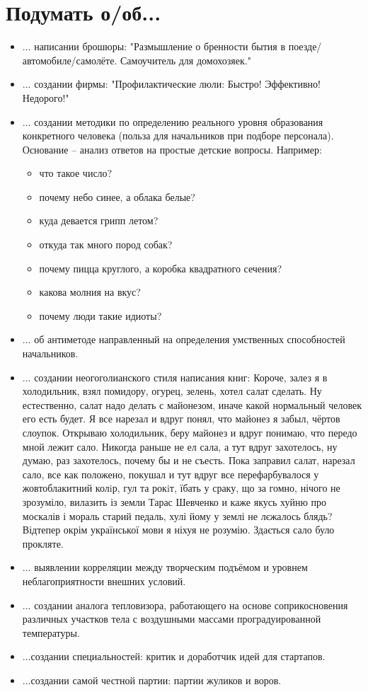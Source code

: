 \section{Подумать о/об...}
\begin{itemize}
\item ... написании брошюры: "Размышление о бренности бытия в поезде/автомобиле/самолёте. Самоучитель для домохозяек."
\item ... создании фирмы: "Профилактические люли: Быстро! Эффективно! Недорого!"
\item ...  создании методики по определению реального уровня образования конкретного человека (польза для начальников при подборе персонала). Основание -- анализ ответов на простые детские вопросы.
Например:
    \begin{itemize}
        \item что такое число?
        \item почему небо синее, а облака белые?
        \item куда девается грипп летом?
        \item откуда так много пород собак?
        \item почему пицца круглого, а коробка квадратного сечения?
        \item какова молния на вкус?
        \item почему люди такие идиоты?
    \end{itemize}
\item ... об антиметоде направленный на определения умственных способностей начальников.    
\item ... создании неогоголианского стиля написания книг:
    Короче, залез я в холодильник, взял помидору, огурец, зелень, хотел салат сделать. Ну естественно, салат надо делать с майонезом, иначе
    какой нормальный человек его есть будет. Я все нарезал и вдруг понял, что майонез я забыл, чёртов слоупок. Открываю холодильник, беру
    майонез и вдруг понимаю, что передо мной лежит сало. Никогда раньше не ел сала, а тут вдруг захотелось, ну думаю, раз захотелось, почему
    бы и не съесть. Пока заправил салат, нарезал сало, все как положено, покушал и тут вдруг все перефарбувалося у жовтоблакитний колiр, гул
    та рокiт, їбать у сраку, що за гомно, нічого не зрозуміло, вилазить із земли Тарас Шевченко и каже якусь хуйню про москалів і мораль
    старий педаль, хулі йому у землі не лєжалось блядь? Відтепер окрім української мови я ніхуя не розумію. Здається сало було прокляте.
\item ... выявлении корреляции между творческим подъёмом и уровнем неблагоприятности внешних условий.
\item ... создании аналога тепловизора, работающего на основе соприкосновения различных участков тела с воздушными массами проградуированной температуры.
\item ...создании специальностей: критик и доработчик идей для стартапов.
\item ...создании самой честной партии: партии жуликов и воров.
\end{itemize}
